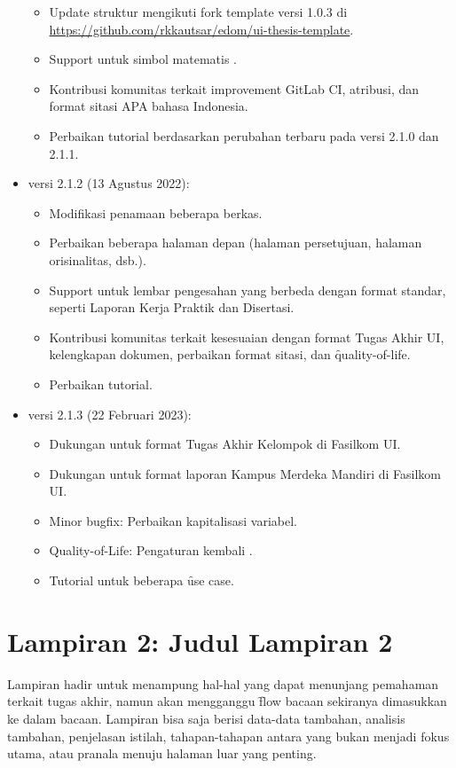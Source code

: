 \begin{itemize}
		\begin{itemize}
			\item Update struktur mengikuti fork template versi 1.0.3 di \url{https://github.com/rkkautsar/edom/ui-thesis-template}.
			\item Support untuk simbol matematis .
			\item Kontribusi komunitas terkait improvement GitLab CI, atribusi, dan format sitasi APA bahasa Indonesia.
			\item Perbaikan tutorial berdasarkan perubahan terbaru pada versi 2.1.0 dan 2.1.1.
		\end{itemize}
	\item versi 2.1.2 (13 Agustus 2022):
		\begin{itemize}
			\item Modifikasi penamaan beberapa berkas.
			\item Perbaikan beberapa halaman depan (halaman persetujuan, halaman orisinalitas, dsb.).
			\item Support untuk lembar pengesahan yang berbeda dengan format standar, seperti Laporan Kerja Praktik dan Disertasi.
			\item Kontribusi komunitas terkait kesesuaian dengan format Tugas Akhir UI, kelengkapan dokumen, perbaikan format sitasi, dan \f{quality-of-life}.
			\item Perbaikan tutorial.
		\end{itemize}
	\item versi 2.1.3 (22 Februari 2023):
		\begin{itemize}
			\item Dukungan untuk format Tugas Akhir Kelompok di Fasilkom UI.
			\item Dukungan untuk format laporan Kampus Merdeka Mandiri di Fasilkom UI.
			\item Minor bugfix: Perbaikan kapitalisasi variabel.
			\item Quality-of-Life: Pengaturan kembali .
			\item Tutorial untuk beberapa \f{use case}.
		\end{itemize}
\end{itemize}

\chapter*{Lampiran 2: Judul Lampiran 2}
\label{appendix:sample}
Lampiran hadir untuk menampung hal-hal yang dapat menunjang pemahaman terkait tugas akhir, namun akan mengganggu \f{flow} bacaan sekiranya dimasukkan ke dalam bacaan.
Lampiran bisa saja berisi data-data tambahan, analisis tambahan, penjelasan istilah, tahapan-tahapan antara yang bukan menjadi fokus utama, atau pranala menuju halaman luar yang penting.

